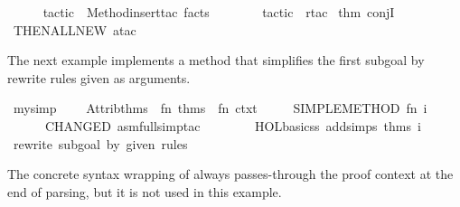 \begin{isabellebody}
\endisatagML
{\isafoldML}%
%
\isadelimML
\isanewline
%
\endisadelimML
%
\isadelimproof
\ \ \ \ %
\endisadelimproof
%
\isatagproof
{}\isamarkupfalse%
\ {}tactic\ {}\ Method{}insert{}tac\ facts\ {}\ {}{}\isanewline
\ \ \ \ \isamarkupfalse%
\ {}tactic\ {}\ {}rtac\ %
\isaantiq
thm\ conjI{}%
\endisaantiq
\ THEN{}ALL{}NEW\ atac{}\ {}\ {}{}\isanewline
\ \ \ \ \isamarkupfalse%
\isanewline
{}\isamarkupfalse%
%
\endisatagproof
{\isafoldproof}%
%
\isadelimproof
%
\endisadelimproof
%
\begin{isamarkuptext}%
\medskip The next example implements a method that simplifies
  the first subgoal by rewrite rules given as arguments.%
\end{isamarkuptext}%
\isamarkuptrue%
%
\isadelimML
%
\endisadelimML
%
\isatagML
{}\isamarkupfalse%
\ my{}simp\ {}\ {}\isanewline
\ \ Attrib{}thms\ {}{}\ {}fn\ thms\ {}{}\ fn\ ctxt\ {}{}\isanewline
\ \ \ \ SIMPLE{}METHOD{}\ {}fn\ i\ {}{}\isanewline
\ \ \ \ \ \ CHANGED\ {}asm{}full{}simp{}tac\isanewline
\ \ \ \ \ \ \ \ {}HOL{}basic{}ss\ addsimps\ thms{}\ i{}{}{}\isanewline
{}\ {}rewrite\ subgoal\ by\ given\ rules{}%
\endisatagML
{\isafoldML}%
%
\isadelimML
%
\endisadelimML
%
\begin{isamarkuptext}%
The concrete syntax wrapping of \hyperlink{command.method-setup}{\mbox{}} always
  passes-through the proof context at the end of parsing, but it is
  not used in this example.


\end{isamarkuptext}
\end{isabellebody}
